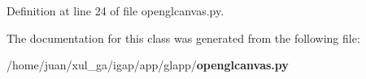 \subsubsection{}\label{classapp_1_1glapp_1_1openglcanvas_1_1IGAGLCanvas_e6211056a7f9ea2e13eca43145f641c3}




Definition at line 24 of file openglcanvas.py.

The documentation for this class was generated from the following file:\begin{CompactItemize}
\item 
/home/juan/xul\_\-ga/igap/app/glapp/{\bf openglcanvas.py}\end{CompactItemize}
